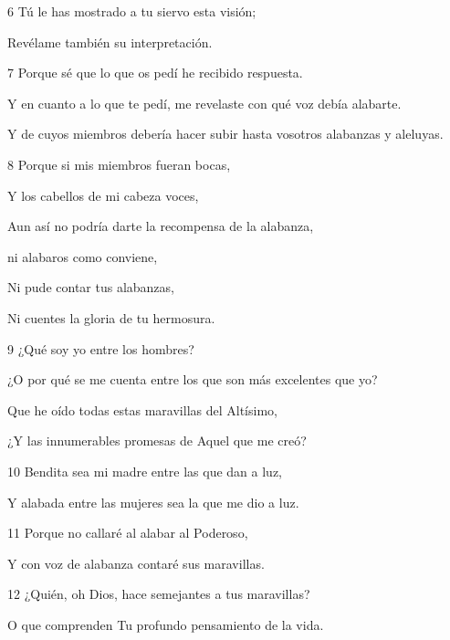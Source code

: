 \par [Quienes con fe se han sometido a ti y a tu ley.]

\par 6 Tú le has mostrado a tu siervo esta visión;

\par Revélame también su interpretación.

\par 7 Porque sé que lo que os pedí he recibido respuesta.

Y en cuanto a lo que te pedí, me revelaste con qué voz debía alabarte.

\par Y de cuyos miembros debería hacer subir hasta vosotros alabanzas y aleluyas.

\par 8 Porque si mis miembros fueran bocas,

\par Y los cabellos de mi cabeza voces,

\par Aun así no podría darte la recompensa de la alabanza,

\par ni alabaros como conviene,

\par Ni pude contar tus alabanzas,

Ni cuentes la gloria de tu hermosura.

\par 9 ¿Qué soy yo entre los hombres?

\par ¿O por qué se me cuenta entre los que son más excelentes que yo?

Que he oído todas estas maravillas del Altísimo,

¿Y las innumerables promesas de Aquel que me creó?

\par 10 Bendita sea mi madre entre las que dan a luz,

Y alabada entre las mujeres sea la que me dio a luz.

\par 11 Porque no callaré al alabar al Poderoso,

Y con voz de alabanza contaré sus maravillas.

\par 12 ¿Quién, oh Dios, hace semejantes a tus maravillas?

\par O que comprenden Tu profundo pensamiento de la vida.


